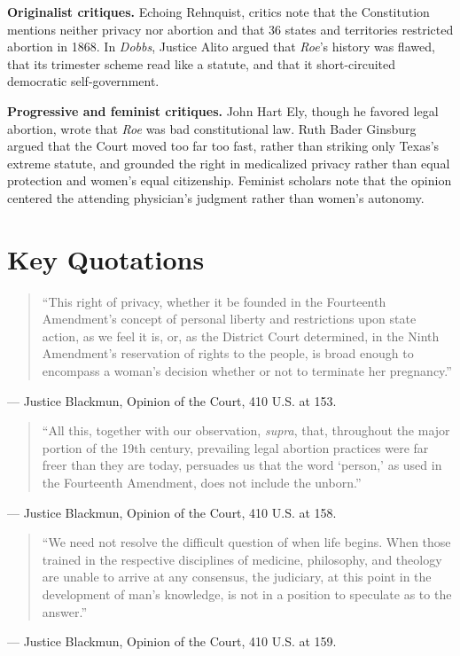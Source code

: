 \documentclass[12pt]{article}
\begin{document}
\textbf{Originalist critiques.} Echoing Rehnquist, critics note that the Constitution mentions neither privacy nor abortion and that 36 states and territories restricted abortion in 1868. In \textit{Dobbs}, Justice Alito argued that \textit{Roe}'s history was flawed, that its trimester scheme read like a statute, and that it short-circuited democratic self-government.

\textbf{Progressive and feminist critiques.} John Hart Ely, though he favored legal abortion, wrote that \textit{Roe} was bad constitutional law. Ruth Bader Ginsburg argued that the Court moved too far too fast, rather than striking only Texas's extreme statute, and grounded the right in medicalized privacy rather than equal protection and women's equal citizenship. Feminist scholars note that the opinion centered the attending physician's judgment rather than women's autonomy.

\section{Key Quotations}

\begin{quote}
``This right of privacy, whether it be founded in the Fourteenth Amendment's concept of personal liberty and restrictions upon state action, as we feel it is, or, as the District Court determined, in the Ninth Amendment's reservation of rights to the people, is broad enough to encompass a woman's decision whether or not to terminate her pregnancy.''
\end{quote}
\noindent --- Justice Blackmun, Opinion of the Court, 410 U.S. at 153.

\begin{quote}
``All this, together with our observation, \textit{supra}, that, throughout the major portion of the 19th century, prevailing legal abortion practices were far freer than they are today, persuades us that the word `person,' as used in the Fourteenth Amendment, does not include the unborn.''
\end{quote}
\noindent --- Justice Blackmun, Opinion of the Court, 410 U.S. at 158.

\begin{quote}
``We need not resolve the difficult question of when life begins. When those trained in the respective disciplines of medicine, philosophy, and theology are unable to arrive at any consensus, the judiciary, at this point in the development of man's knowledge, is not in a position to speculate as to the answer.''
\end{quote}
\noindent --- Justice Blackmun, Opinion of the Court, 410 U.S. at 159.
\end{document}
